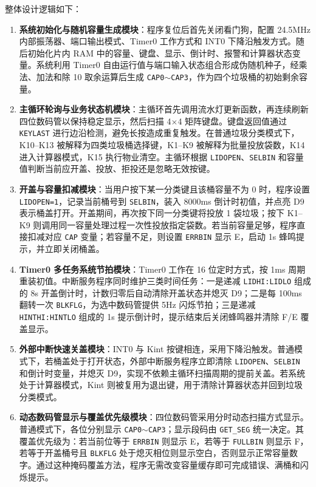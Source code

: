 \documentclass[12pt,a4paper]{article}
\begin{document}
整体设计逻辑如下：
\begin{enumerate}
    \item \textbf{系统初始化与随机容量生成模块}：程序复位后首先关闭看门狗，配置 24.5MHz 内部振荡器、端口输出模式、Timer0 工作方式和 INT0 下降沿触发方式。随后初始化片内 RAM 中的容量、键盘、显示、倒计时、报警和计算器状态变量。系统利用 Timer0 自由运行值与端口输入状态组合形成伪随机种子，经乘法、加法和除 10 取余运算后生成 \texttt{CAP0$\sim$CAP3}，作为四个垃圾桶的初始剩余容量。

    \item \textbf{主循环轮询与业务状态机模块}：主循环首先调用流水灯更新函数，再连续刷新四位数码管以保持稳定显示，然后扫描 4$\times$4 矩阵键盘。键盘返回值通过 \texttt{KEYLAST} 进行边沿检测，避免长按造成重复触发。在普通垃圾分类模式下，K10--K13 被解释为四类垃圾桶选择键，K1--K9 被解释为批量投放袋数，K14 进入计算器模式，K15 执行物业清空。主循环根据 \texttt{LIDOPEN}、\texttt{SELBIN} 和容量值判断当前应开盖、投放、拒投还是忽略无效按键。

    \item \textbf{开盖与容量扣减模块}：当用户按下某一分类键且该桶容量不为 0 时，程序设置 \texttt{LIDOPEN=1}，记录当前桶号到 \texttt{SELBIN}，装入 8000ms 倒计时初值，并点亮 D9 表示桶盖打开。开盖期间，再次按下同一分类键将投放 1 袋垃圾；按下 K1--K9 则调用同一容量处理过程一次性投放指定袋数。若当前容量足够，程序直接扣减对应 \texttt{CAP} 变量；若容量不足，则设置 \texttt{ERRBIN} 显示 E，启动 1s 蜂鸣提示，并立即关闭桶盖。

    \item \textbf{Timer0 多任务系统节拍模块}：Timer0 工作在 16 位定时方式，按 1ms 周期重装初值。中断服务程序同时维护三类时间任务：一是递减 \texttt{LIDHI:LIDLO} 组成的 8s 开盖倒计时，计数归零后自动清除开盖状态并熄灭 D9；二是每 100ms 翻转一次 \texttt{BLKFLG}，为选中数码管提供 5Hz 闪烁节拍；三是递减 \texttt{HINTHI:HINTLO} 组成的 1s 提示倒计时，提示结束后关闭蜂鸣器并清除 F/E 覆盖显示。

    \item \textbf{外部中断快速关盖模块}：INT0 与 Kint 按键相连，采用下降沿触发。普通模式下，若桶盖处于打开状态，外部中断服务程序立即清除 \texttt{LIDOPEN}、\texttt{SELBIN} 和倒计时变量，并熄灭 D9，实现不依赖主循环扫描周期的提前关盖。若系统处于计算器模式，Kint 则被复用为退出键，用于清除计算器状态并回到垃圾分类模式。

    \item \textbf{动态数码管显示与覆盖优先级模块}：四位数码管采用分时动态扫描方式显示。普通模式下，各位分别显示 \texttt{CAP0$\sim$CAP3}；显示段码由 \texttt{GET\_SEG} 统一决定。其覆盖优先级为：若当前位等于 \texttt{ERRBIN} 则显示 E，若等于 \texttt{FULLBIN} 则显示 F，若等于开盖桶号且 \texttt{BLKFLG} 处于熄灭相位则显示空白，否则显示正常容量数字。通过这种掩码覆盖方法，程序无需改变容量缓存即可完成错误、满桶和闪烁提示。


\end{enumerate}
\end{document}
